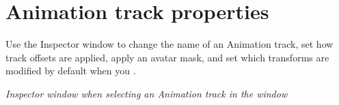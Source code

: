\chapter{Animation track properties}
\hypertarget{md__hey_tea_9_2_library_2_package_cache_2com_8unity_8timeline_0d1_87_85_2_documentation_0i_2insp__trk__anim}{}\label{md__hey_tea_9_2_library_2_package_cache_2com_8unity_8timeline_0d1_87_85_2_documentation_0i_2insp__trk__anim}
\label{md__hey_tea_9_2_library_2_package_cache_2com_8unity_8timeline_0d1_87_85_2_documentation_0i_2insp__trk__anim_autotoc_md4684}%
%
 Use the Inspector window to change the name of an Animation track, set how track offsets are applied, apply an avatar mask, and set which transforms are modified by default when you .



{\itshape Inspector window when selecting an Animation track in the  window}

